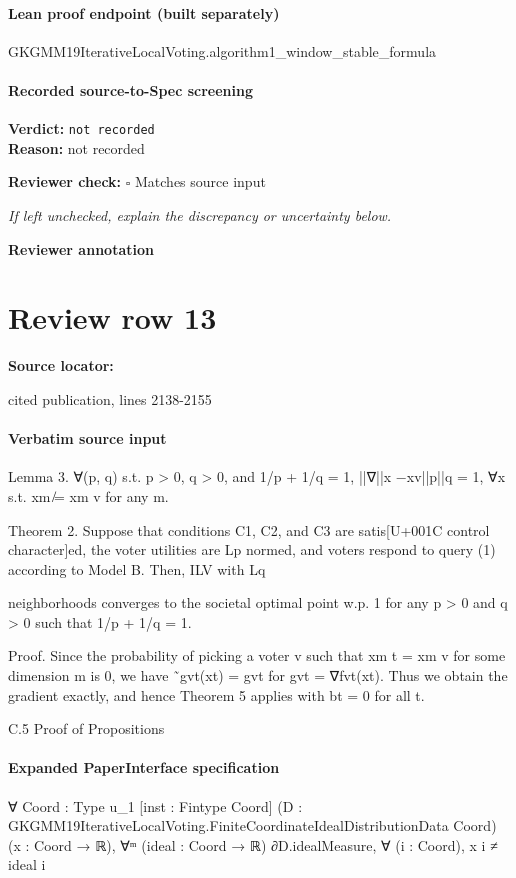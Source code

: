 \documentclass[10pt]{article}
\newcommand{\reviewerbox}{%
  \par\noindent\fbox{\parbox{0.96\linewidth}{\rule{0pt}{0.38in}}}\par
}
\newcommand{\reviewmatch}[1]{%
  \par\noindent\textbf{Reviewer check:} $\square$\; #1\par
  \noindent\emph{If left unchecked, explain the discrepancy or uncertainty below.}\par
}
\begin{document}
\paragraph{Lean proof endpoint (built separately)}\begin{ReviewVerbatim}
GKGMM19IterativeLocalVoting.algorithm1_window_stable_formula
\end{ReviewVerbatim}

\paragraph{Recorded source-to-Spec screening}
\textbf{Verdict:} \texttt{not recorded}
\\
\textbf{Reason:} not recorded
\reviewmatch{Matches source input}
\noindent\textbf{Reviewer annotation}\par
\reviewerbox
\clearpage
\hypertarget{source-claim-5733b74f6b39bb81}{}
\section*{Review row 13}
\textbf{Source locator:} {\footnotesize\raggedright cited publication, lines 2138-\allowbreak{}2155\par}
\paragraph{Verbatim source input}
\begin{ReviewVerbatim}
Lemma 3. ∀(p, q) s.t. p > 0, q > 0, and 1/p + 1/q = 1, ||∇||x −xv||p||q = 1, ∀x s.t.
xm ̸= xm
v for any m.

Theorem 2. Suppose that conditions C1, C2, and C3 are satis[U+001C control character]ed, the voter utilities are
Lp normed, and voters respond to query (1) according to Model B. Then, ILV with Lq

neighborhoods converges to the societal optimal point w.p. 1 for any p > 0 and q > 0 such
that 1/p + 1/q = 1.

Proof. Since the probability of picking a voter v such that xm
t = xm
v for some dimension m
is 0, we have ˜gvt(xt) = gvt for gvt = ∇fvt(xt). Thus we obtain the gradient exactly, and
hence Theorem 5 applies with bt = 0 for all t.

C.5 Proof of Propositions
\end{ReviewVerbatim}


\paragraph{Expanded PaperInterface specification}
\begin{ReviewVerbatim}
∀ {Coord : Type u_1} [inst : Fintype Coord]
  (D : GKGMM19IterativeLocalVoting.FiniteCoordinateIdealDistributionData Coord) (x : Coord → ℝ),
  ∀ᵐ (ideal : Coord → ℝ) ∂D.idealMeasure, ∀ (i : Coord), x i ≠ ideal i
\end{ReviewVerbatim}
\end{document}
